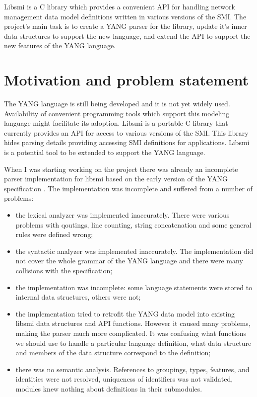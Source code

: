 \documentclass[conference]{IEEEtran}
\begin{document}
Libsmi is a C library which provides a convenient API for handling network management data model definitions written in various versions of the SMI. The project's main task is to create a YANG parser for the library, update it's inner data structures to support the new language, and extend the API to support the new features of the YANG language.

\section{Motivation and problem statement}
The YANG language is still being developed and it is not yet widely used. Availability of convenient programming tools which support this modeling language might facilitate its adoption. Libsmi is  a portable C library that currently provides an API for access to various versions of the SMI. This library hides parsing details providing accessing SMI definitions for applications. Libsmi is a potential tool to be extended to support the YANG language. 

When I was starting working on the project there was already an incomplete parser implementation for libsmi based on the early version of the YANG specification  \cite{bib2}. The implementation was incomplete and suffered from a number of problems: 
\begin{itemize}
	\item the lexical analyzer was implemented inaccurately. There were various problems with qoutings, line counting, string concatenation and some general rules were defined wrong;
	\item the syntactic analyzer was implemented inaccurately. The implementation did not cover the whole grammar of the YANG language and there were many collisions with the specification;
	\item the implementation was incomplete: some language statements were stored to internal data structures, others were not;
	\item the implementation tried to retrofit the YANG data model into existing libsmi data structures and API functions. However it caused many problems, making the parser much more complicated. It was confusing what functions we should use to handle a particular language definition, what data structure and members of the data structure correspond to the definition;
	\item there was no semantic analysis. References to groupings, types, features, and identities were not resolved, uniqueness of identifiers was not validated, modules knew nothing about definitions in their submodules.
\end{itemize}
\end{document}
